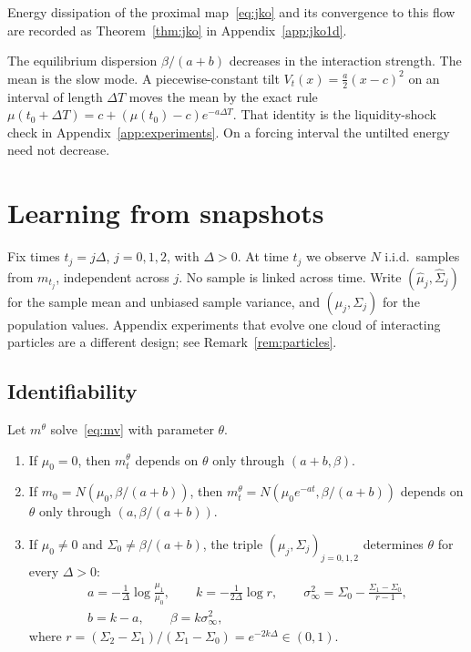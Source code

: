 \documentclass[anon,11pt]{alt2027}
\begin{document}
Energy dissipation of the proximal map~\eqref{eq:jko} and its convergence to
this flow are recorded as Theorem~\ref{thm:jko} in
Appendix~\ref{app:jko1d}.

The equilibrium dispersion $\beta/(a+b)$ decreases in the interaction strength.
The mean is the slow mode. A piecewise-constant tilt
$V_t(x)=\frac a2(x-c)^2$ on an interval of length $\Delta T$ moves the mean by
the exact rule $\mu(t_0+\Delta T)=c+(\mu(t_0)-c)e^{-a\Delta T}$. That identity is
the liquidity-shock check in Appendix~\ref{app:experiments}. On a forcing
interval the untilted energy need not decrease.

\section{Learning from snapshots}
\label{sec:learning}

Fix times $t_j=j\Delta$, $j=0,1,2$, with $\Delta>0$. At time $t_j$ we observe
$N$ i.i.d.\ samples from $m_{t_j}$, independent across $j$. No sample is linked
across time. Write $(\hat\mu_j,\hat\Sigma_j)$ for the sample mean and unbiased
sample variance, and $(\mu_j,\Sigma_j)$ for the population values.
Appendix experiments that evolve one cloud of interacting particles are a
different design; see Remark~\ref{rem:particles}.

\subsection{Identifiability}

\begin{proposition}
\label{prop:ident}
Let $m^\theta$ solve~\eqref{eq:mv} with parameter $\theta$.
\begin{enumerate}
\item[(i)] If $\mu_0=0$, then $m^\theta_t$ depends on $\theta$ only through
$(a+b,\beta)$.
\item[(ii)] If $m_0=N(\mu_0,\beta/(a+b))$, then
$m^\theta_t=N(\mu_0 e^{-at},\beta/(a+b))$ depends on $\theta$ only through
$(a,\beta/(a+b))$.
\item[(iii)] If $\mu_0\neq 0$ and $\Sigma_0\neq\beta/(a+b)$, the triple
$(\mu_j,\Sigma_j)_{j=0,1,2}$ determines $\theta$ for every $\Delta>0$:
\begin{equation}
\label{eq:g}
\begin{gathered}
a=-\frac1\Delta\log\frac{\mu_1}{\mu_0},
\qquad
k=-\frac1{2\Delta}\log r,
\qquad
\sigma_\infty^2
=
\Sigma_0-\frac{\Sigma_1-\Sigma_0}{r-1},\\
b=k-a,
\qquad
\beta=k\sigma_\infty^2,
\end{gathered}
\end{equation}
where $r=(\Sigma_2-\Sigma_1)/(\Sigma_1-\Sigma_0)=e^{-2k\Delta}\in(0,1)$.
\end{enumerate}
\end{proposition}
\end{document}
